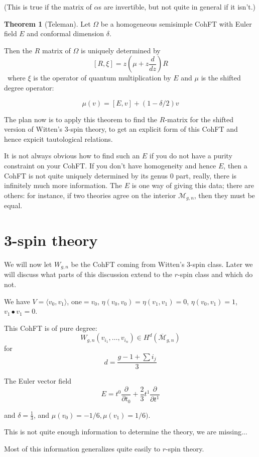 \documentclass{amsart}
\theoremstyle{definition}
\newtheorem{theorem}{Theorem}
\newcommand{\one}{\text{one}}
\newcommand{\Mbar}{\overline{\mathcal{M}}}
\begin{document}
(This is true if the matrix of $\alpha$s are invertible, but not quite in general if it isn't.)

\begin{theorem}[Teleman]
Let $\Omega$ be a homogeneous semisimple CohFT with Euler field $E$ and conformal dimension $\delta$.  

Then the $R$ matrix of $\Omega$ is uniquely determined by 
$$[R,\xi]=z\left(\mu+z\frac{d}{dz}\right) R$$\
where $\xi$ is the operator of quantum multiplication by $E$ and $\mu$ is the shifted degree operator:

$$\mu(v)=[E,v]+(1-\delta/2)v$$
\end{theorem}

The plan now is to apply this theorem to find the $R$-matrix for the shifted version of Witten's 3-spin theory, to get an explicit form of this CohFT and hence expicit tautological relations.

It is not always obvious how to find such an $E$ if you do not have a purity constraint on your CohFT.  If you don't have homogeneity and hence $E$, then a CohFT is not quite uniquely determined by its genus 0 part, really, there is infinitely much more information.  The $E$ is one way of giving this data; there are others: for instance, if two theories agree on the interior $\mathcal{M}_{g,n}$, then they must be equal.

\section{3-spin theory}
We will now let $W_{g,n}$ be the CohFT coming from Witten's 3-spin class.  Later we will discuss what parts of this discussion extend to the $r$-spin class and which do not.

We have $V=\langle v_0, v_1\rangle$, $\one=v_0$, $\eta(v_0,v_0)=\eta(v_1,v_1)=0$, $\eta(v_0,v_1)=1$, $v_1\bullet v_1=0$.

This CohFT is of pure degree:
$$W_{g,n}(v_{i_1},\dots,v_{i_n})\in H^d(\Mbar_{g,n})$$
for $$d=\frac{g-1+\sum i_j}{3}$$

The Euler vector field $$E=t^0\frac{\partial}{\partial t_0}+\frac{2}{3}t^1\frac{\partial}{\partial t^1}$$

and $\delta=\frac{1}{3}$, and $\mu(v_0)=-1/6, \mu(v_1)=1/6)$.

This is not quite enough information to determine the theory, we are missing...

Most of this information generalizes quite easily to $r$-spin theory.
\end{document}
